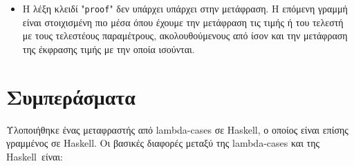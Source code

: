 \documentclass[diploma]{softlab-thesis}
\def\H{Haskell}
\begin{document}
\begin{itemize}
\begin{itemize}
\item
Η λέξη κλειδί "\texttt{proof}" δεν υπάρχει υπάρχει στην μετάφραση. Η
επόμενη γραμμή είναι στοιχισμένη πιο μέσα όπου έχουμε την μετάφραση τις τιμής
ή του τελεστή με τους τελεστέους παραμέτρους, ακολουθούμενους από ίσον και
την μετάφραση της έκφρασης τιμής με την οποία ισούνται.

\end{itemize}

\end{itemize}

\chapter{Συμπεράσματα}


Υλοποιήθηκε ένας μεταφραστής από lambda-cases σε \H, ο οποίος είναι επίσης
γραμμένος σε \H.  Οι βασικές διαφορές μεταξύ της lambda-cases και της \H\
είναι:
\end{document}
